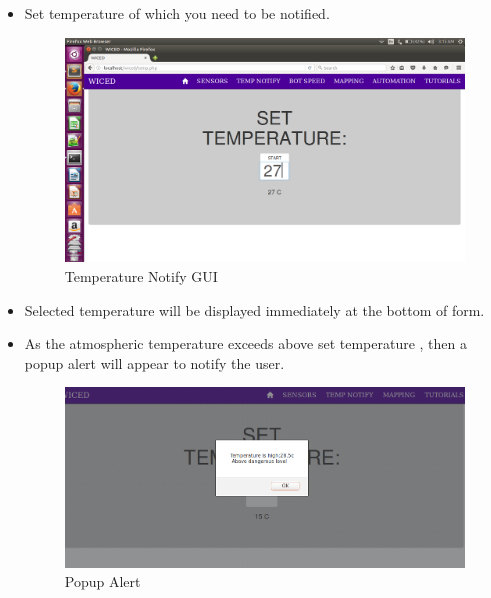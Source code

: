 \documentclass[11pt,a4paper]{article}
\begin{document}
\begin{itemize}
	 \newpage
	 \item Set temperature of which you need to be notified.
	 \begin{figure}[h]
    \centering
	\includegraphics[scale=0.3]{temp12.png}
	\caption{Temperature Notify GUI}
	\end{figure}
	 
	 \item Selected temperature will be displayed immediately at the bottom of form.
	  \item As the atmospheric temperature exceeds above set temperature , then a popup alert will appear to notify the user.
	 
	  \begin{figure}[h]
    \centering
	\includegraphics[scale=0.3]{popup_alert.png}
	\caption{Popup Alert}
	\end{figure}
	 \end{itemize}
	 
	 
	 \newpage
\end{document}
